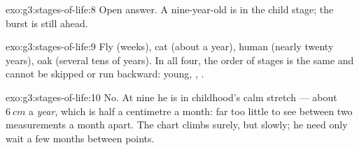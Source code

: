 \begin{solution}{exo:g3:stages-of-life:8}
Open answer. A nine-year-old is in the child stage; the
 burst is still ahead.
\end{solution}

\begin{solution}{exo:g3:stages-of-life:9}
Fly (weeks), cat (about a year), human (nearly twenty years),
oak (several tens of years). In all four, the order of stages is
the same and cannot be skipped or run backward: young, ,
.
\end{solution}

\begin{solution}{exo:g3:stages-of-life:10}
No. At nine he is in childhood's calm stretch --- about
$\qty{6}{cm}$ a \emph{year}, which is half a centimetre a month:
far too little to see between two measurements a month apart.
The chart climbs surely, but slowly; he need only wait a few
months between points.
\end{solution}
